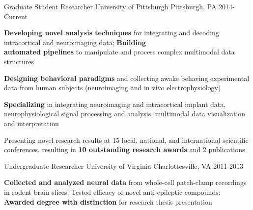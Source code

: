 \vspace*{-0.25cm}

\vspace*{0.3cm}

\begin{cventries}

\cventry
    {Graduate Student Researcher} %
    {University of Pittsburgh} %
    {Pittsburgh, PA} %
    {2014-Current} %
    {
      \begin{cvitems} %
        \item {\textbf{Developing novel analysis techniques} for integrating and decoding intracortical and neuroimaging data; \textbf{Building \\ automated pipelines} to manipulate and process complex multimodal data structures}
        \item {\textbf{Designing behavioral paradigms} and collecting awake behaving experimental data from human subjects (neuroimaging and in vivo electrophysiology)}
		\item {\textbf{Specializing} in integrating neuroimaging and intracortical implant data, neurophysiological signal processing and analysis, multimodal data visualization and interpretation}        
        \item {Presenting novel research results at 15 local, national, and international scientific conferences, resulting in \textbf{10 outstanding research awards} and 2 publications}
      \end{cvitems}
    }
    \vspace*{0.2cm}
    
\cventry
    {Undergraduate Researcher}%
    {University of Virginia}
    {Charlottesville, VA} %
    {2011-2013} %
    {
      \begin{cvitems}
      	\item {\textbf{Collected and analyzed neural data} from whole-cell patch-clamp recordings in rodent brain slices; Tested efficacy of novel anti-epileptic compounds; \textbf{Awarded degree with distinction} for research thesis presentation}
      \end{cvitems}
    }
    \vspace*{0.2cm}


\end{cventries}
